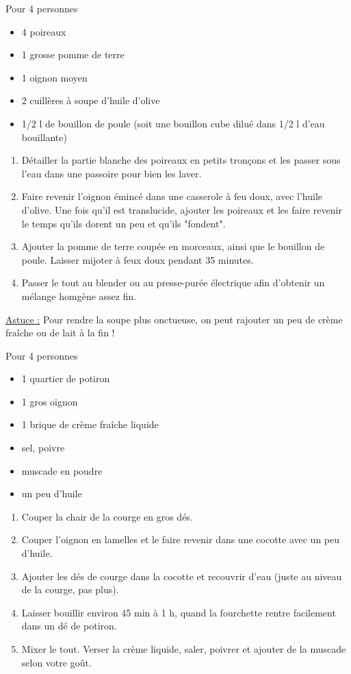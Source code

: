 \bigskip
{}
{Pour 4 personnes}{\begin{itemize}
	\item 4 poireaux
	\item 1 grosse pomme de terre
	\item 1 oignon moyen
	\item 2 cuillères à soupe d'huile d'olive
	\item 1/2 l de bouillon de poule (soit une bouillon cube dilué dans 1/2 l d'eau bouillante) 
\end{itemize}}
{\begin{enumerate}
	\item Détailler la partie blanche des poireaux en petits tronçons et les passer sous l'eau dans une passoire pour bien les laver. 
	\item Faire revenir l'oignon émincé dans une casserole à feu doux, avec l'huile d'olive. Une fois qu'il est translucide, ajouter les poireaux et les faire revenir le temps qu'ils dorent un peu et qu'ils "fondent".
	\item Ajouter la pomme de terre coupée en morceaux, ainsi que le bouillon de poule. Laisser mijoter à feux doux pendant 35 minutes.
	\item Passer le tout au blender ou au presse-purée électrique afin d'obtenir un mélange homgène assez fin. 
\end{enumerate}

\underline{Astuce :} Pour rendre la soupe plus onctueuse, on peut rajouter un peu de crème fraîche ou de lait à la fin !}

\bigskip
{}
{Pour 4 personnes}{\begin{itemize}
	\item 1 quartier de potiron
	\item 1 gros oignon
	\item 1 brique de crème fraîche liquide
	\item sel, poivre
	\item muscade en poudre
	\item un peu d'huile
\end{itemize}}
{\begin{enumerate}
	\item Couper la chair de la courge en gros dés.
	\item Couper l'oignon en lamelles et le faire revenir dans une cocotte avec un peu d'huile.
	\item Ajouter les dés de courge dans la cocotte et recouvrir d'eau (juste au niveau de la courge, pas plus).
	\item Laisser bouillir environ 45 min à 1 h, quand la fourchette rentre facilement dans un dé de potiron.
	\item Mixer le tout. Verser la crème liquide, saler, poivrer et ajouter de la muscade selon votre goût. 
\end{enumerate}}
